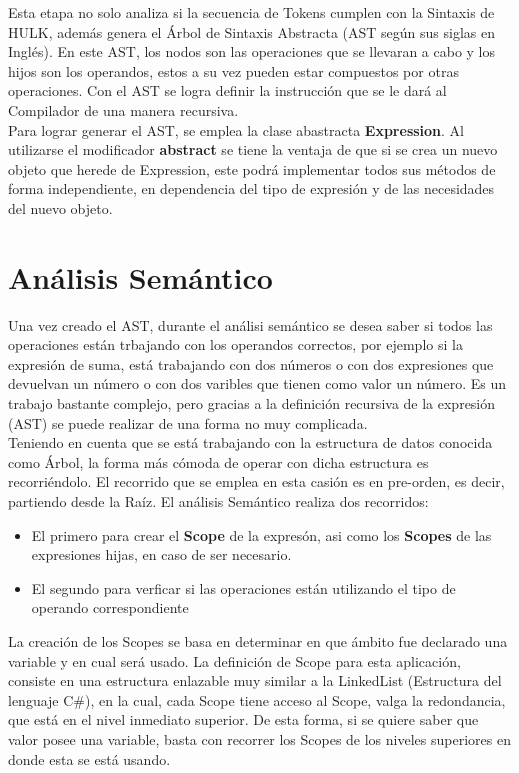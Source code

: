 \documentclass[10pt,a4paper]{article}
\begin{document}
Esta etapa no solo analiza si la secuencia de Tokens cumplen con la Sintaxis de HULK, adem\'as genera el \'Arbol de Sintaxis Abstracta (AST seg\'un sus siglas en Ingl\'es). En este AST, los nodos son las operaciones que se llevaran a cabo y los hijos son los operandos, estos a su vez pueden estar compuestos por otras operaciones. Con el AST se logra definir la instrucci\'on que se le dar\'a al Compilador de una manera recursiva.\\ 

Para lograr generar el AST, se emplea la clase abastracta \textbf{Expression}. Al utilizarse el modificador \textbf{abstract} se tiene la ventaja de que si se crea un nuevo objeto que herede de Expression, este podr\'a implementar todos sus m\'etodos de forma independiente, en dependencia del tipo de expresi\'on y de las necesidades del nuevo objeto.\\

\section{An\'alisis Sem\'antico}
Una vez creado el AST, durante el an\'alisi sem\'antico se desea saber si todos las operaciones est\'an trbajando con los operandos correctos, por ejemplo si la expresi\'on de suma, est\'a trabajando con dos n\'umeros o con dos expresiones que devuelvan un n\'umero o con dos varibles que tienen como valor un n\'umero. Es un trabajo bastante complejo, pero gracias a la definici\'on recursiva de la expresi\'on (AST) se puede realizar de una forma no muy complicada.\\

Teniendo en cuenta que se est\'a trabajando con la estructura de datos conocida como \'Arbol, la forma m\'as c\'omoda de operar con dicha estructura es recorri\'endolo. El recorrido que se emplea en esta casi\'on es en pre-orden, es decir, partiendo desde la Ra\'iz. El an\'alisis Sem\'antico realiza dos recorridos: 
\begin{itemize}
\item El primero para crear el \textbf{Scope} de la expres\'on, asi como los \textbf{Scopes} de las expresiones hijas, en caso de ser necesario.  
\item El segundo para verficar si las operaciones est\'an utilizando el tipo de operando correspondiente
\end{itemize}

La creaci\'on de los Scopes se basa en determinar en que \'ambito fue declarado una variable y en cual ser\'a usado. La definici\'on de Scope para esta aplicaci\'on, consiste en una estructura enlazable muy similar a la LinkedList (Estructura del lenguaje C\#), en la cual, cada Scope tiene acceso al Scope, valga la redondancia, que est\'a en el nivel inmediato superior. De esta forma, si se quiere saber que valor posee una variable, basta con recorrer los Scopes de los niveles superiores en donde esta se est\'a usando. \\
\end{document}
